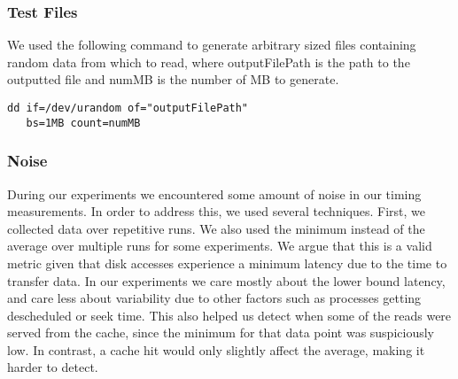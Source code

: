 \subsubsection{Test Files}
We used the following command to generate arbitrary sized files containing random
data from which to read, where outputFilePath is the path to the outputted file 
and numMB is the number of MB to generate.

\begin{verbatim}
dd if=/dev/urandom of="outputFilePath" 
   bs=1MB count=numMB
\end{verbatim}

\subsubsection{Noise}
During our experiments we encountered some amount of noise in our 
timing measurements. In order to address this, we used several techniques. First,
we collected data over repetitive runs. We also used the minimum instead of the average
over multiple runs for some experiments. We argue that this is a valid metric given 
that disk accesses experience a minimum latency due to the time to transfer data.
In our experiments we care mostly about the lower bound latency, and care less about 
variability due to other factors such as processes getting descheduled or seek time. 
This also helped us detect when some of the reads were served from the cache, since the minimum 
for that data point was suspiciously low. In contrast, a cache hit would only slightly affect the average,
making it harder to detect.
